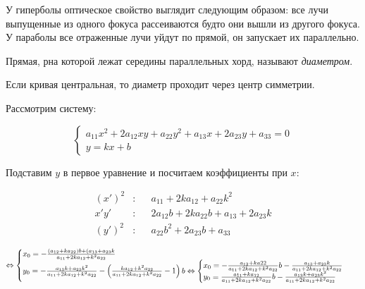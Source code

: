 \begin{Rem}
	У гиперболы оптическое свойство выглядит следующим образом: все лучи выпущенные из одного фокуса рассеиваются будто они вышли из другого фокуса. 
	У параболы все отраженные лучи уйдут по прямой, он запускает их параллельно. 
\end{Rem}

\begin{figure}[h]
	\centering
	\def\svgwidth{.7\columnwidth}
		
\end{figure}


\begin{Def}
	Прямая, рна которой лежат середины параллельных хорд, называют \textit{диаметром}.
\end{Def}

\begin{Rem}
	Если кривая центральная, то диаметр проходит через центр симметрии.
\end{Rem}

Рассмотрим систему:

\[\begin{cases}
	a_{11} x^2 + 2 a_{12} xy + a_{22} y^2 + a_{13} x + 2 a_{23} y + a_{33} = 0 \\
	y = kx + b
\end{cases}\]

\begin{figure}
	\centering
	\def\svgwidth{.2\columnwidth}
	
\end{figure}

Подставим $y$ в первое уравнение и посчитаем коэффициенты при $x$:

\begin{align*}
	(x')^2 &: &&a_{11} + 2ka_{12} + a_{22} k^2 \\
	x'y' &: &&2a_{12} b + 2ka_{22} b + a_{13} + 2a_{23} k \\
	(y')^2 &: &&a_{22} b^2 + 2a_{23} b + a_{33}
\end{align*}

\[\Leftrightarrow \begin{cases}
	x_0 = - \frac{(a_{12} + k a_{22}) b + (a_{13} + a_{23}k}{a_{11} + 2ka_{12} + k^2 a_{22}} \\
	y_0 = - \frac{a_{13} k + a_{23} k^2}{a_{11} + 2ka_{12} + k^2a_{22}} - \left( \frac{ka_{12} + k^2 a_{22}}{a_{11} + 2ka_{12} + k^2 a_{22}} - 1\right)b \Leftrightarrow \begin{cases}
		x_0 = - \frac{a_{12} + ka22}{a_{11} + 2ka_{12} + k^2a_{22}}b - \frac{a_{13} + a_{23}k}{a_{11} + 2ka_{12} + k^2 a_{22}} \\
		y_0 = \frac{a_{11} + ka_{12}}{a_{11} + 2ka_{12} + k^2a_{22}}b - \frac{a_{13}k + a_{23} k^2}{a_{11} + 2ka_{12} + k^2 a_{22}}
	\end{cases}
\end{cases}\]

